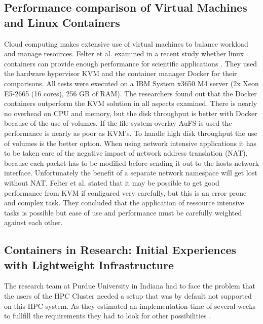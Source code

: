 \documentclass[conference]{IEEEtran}
\begin{document}
\subsection{Performance comparison of Virtual Machines and Linux Containers}
Cloud computing makes extensive use of virtual machines to balance workload and manage resources. Felter et al. examined in a recent study whether linux containers can provide enough performance for scientific applications \cite{Felter2015}. They used the hardware hypervisor KVM \cite{KVM} and the container manager Docker for their comparisons. All tests were executed on a IBM System x3650 M4 server (2x Xeon E5-2665 (16 cores), 256 GB of RAM). The researchers found out that the Docker containers outperform the KVM solution in all aspects examined. There is nearly no overhead on CPU and memory, but the disk throughput is better with Docker because of the use of volumes. If the file system overlay AuFS is used the performance is nearly as poor as KVM's. To handle high disk throughput the use of volumes is the better option. When using network intensive applications it has to be taken care of the negative impact of network address translation (NAT), because each packet has to be modified before sending it out to the hosts network interface. Unfortunately the benefit of a separate network namespace will get lost without NAT. Felter et al. stated that it may be possible to get good performance from KVM if configured very carefully, but this is an error-prone and complex task. They concluded that the application of ressource intensive tasks is possible but ease of use and performance must be carefully weighted against each other.

\subsection{Containers in Research: Initial Experiences with
Lightweight Infrastructure}
The research team at Purdue University in Indiana had to face the problem that the users of the HPC Cluster needed a setup that was by default not supported on this HPC system. As they estimated an implementation time of several weeks to fullfill the requirements they had to look for other possibilities \cite{Julian2016}.\\
\end{document}
